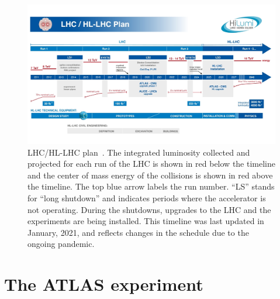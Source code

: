 \begin{figure}
    \centering
    \includegraphics[width = \textwidth]{figures/HL-LHC-updated-January-2021_small.jpg}
    \caption{LHC/HL-LHC plan~\cite{hl-lhc_plan_picture_website}. The integrated luminosity collected and projected for each run of the LHC is shown in red below the timeline and the center of mass energy of the collisions is shown in red above the timeline. The top blue arrow labels the run number. ``LS'' stands for ``long shutdown'' and indicates periods where the accelerator is not operating. During the shutdowns, upgrades to the LHC and the experiments are being installed. This timeline was last updated in January, 2021, and reflects changes in the schedule due to the ongoing pandemic. }
    \label{fig:hl-lhc}
\end{figure}



\section{The ATLAS experiment}
\label{sec:atlas}


